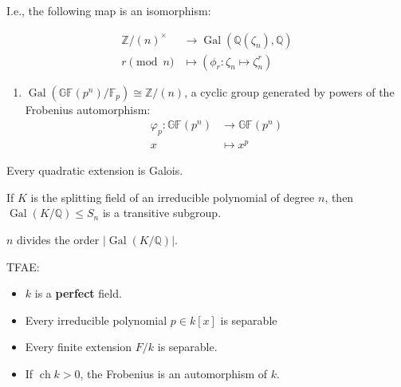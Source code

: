 I.e., the following map is an isomorphism:

\begin{align*}
  {\mathbb{Z}}/(n)^{\times}&\to \operatorname{Gal}({\mathbb{Q}}(\zeta_n), {\mathbb{Q}}) \\
  r \pmod n &\mapsto (\phi_r: \zeta_n \mapsto \zeta_n^r )
  \end{align*}

\begin{enumerate}
\def\labelenumi{\arabic{enumi}.}
\setcounter{enumi}{1}
\tightlist
\item
  \(\operatorname{Gal}({\mathbb{GF}}(p^n)/{\mathbb{F}}_p) \cong {\mathbb{Z}}/(n)\),
  a cyclic group generated by powers of the Frobenius automorphism:
  \begin{align*}
    \varphi_p: {\mathbb{GF}}(p^n) &\to {\mathbb{GF}}(p^n) \\
    x &\mapsto x^p
  \end{align*}
\end{enumerate}

\begin{proposition}

Every quadratic extension is Galois.

\end{proposition}

\begin{proposition}

If \(K\) is the splitting field of an irreducible polynomial of degree
\(n\), then \(\operatorname{Gal}(K/{\mathbb{Q}}) \leq S_n\) is a
transitive subgroup.

\end{proposition}

\begin{corollary}

\(n\) divides the order
\({\left\lvert { \operatorname{Gal}(K/{\mathbb{Q}})} \right\rvert}\).

\end{corollary}

\begin{theorem}

TFAE:

\begin{itemize}
\item
  \(k\) is a \textbf{perfect} field.
\item
  Every irreducible polynomial \(p\in k[x]\) is separable
\item
  Every finite extension \(F/k\) is separable.
\item
  If \(\operatorname{ch}k > 0\), the Frobenius is an automorphism of
  \(k\).
\end{itemize}

\end{theorem}

